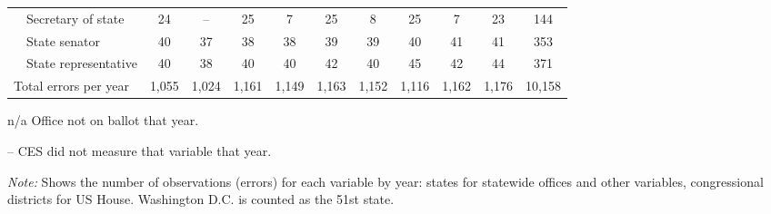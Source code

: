 \begin{table}[!htbp]
{\begin{threeparttable}
\begin{tabular}{lcccccccccc}
~~Secretary of state & 24 & -- & 25 & 7 & 25 & 8 & 25 & 7 & 23 & 144 \\
~~State senator & 40 & 37 & 38 & 38 & 39 & 39 & 40 & 41 & 41 & 353 \\
~~State representative & 40 & 38 & 40 & 40 & 42 & 40 & 45 & 42 & 44 & 371 \\
\midrule
Total errors per year & 1,055 & 1,024 & 1,161 & 1,149 & 1,163 & 1,152 & 1,116 & 1,162 & 1,176 & 10,158 \\
\bottomrule
\end{tabular}
\begin{tablenotes}
\footnotesize
\item n/a Office not on ballot that year.
\item -- CES did not measure that variable that year.
\item \textit{Note:} Shows the number of observations (errors) for each variable by year: states for statewide offices and other variables, congressional districts for US House. Washington D.C. is counted as the 51st state.
\end{tablenotes}
\end{threeparttable}%
}
\end{table}